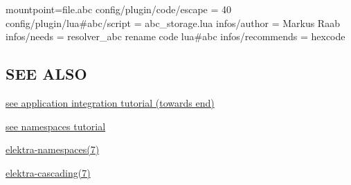 \begin{DoxyCode}
[]
mountpoint=file.abc
config/plugin/code/escape = 40
config/plugin/lua#abc/script = abc\_storage.lua
infos/author = Markus Raab
infos/needs = resolver\_abc rename code lua#abc
infos/recommends = hexcode
\end{DoxyCode}


\subsection*{S\+EE A\+L\+SO}


\begin{DoxyItemize}
\item \hyperlink{doc_tutorials_application-integration_md}{see application integration tutorial (towards end)}
\item \hyperlink{doc_tutorials_namespaces_md}{see namespaces tutorial}
\item \hyperlink{md_doc_help_elektra-namespaces_doc_help_elektra-namespaces_md}{elektra-\/namespaces(7)}
\item \hyperlink{md_doc_help_elektra-cascading_doc_help_elektra-cascading_md}{elektra-\/cascading(7)} 
\end{DoxyItemize}